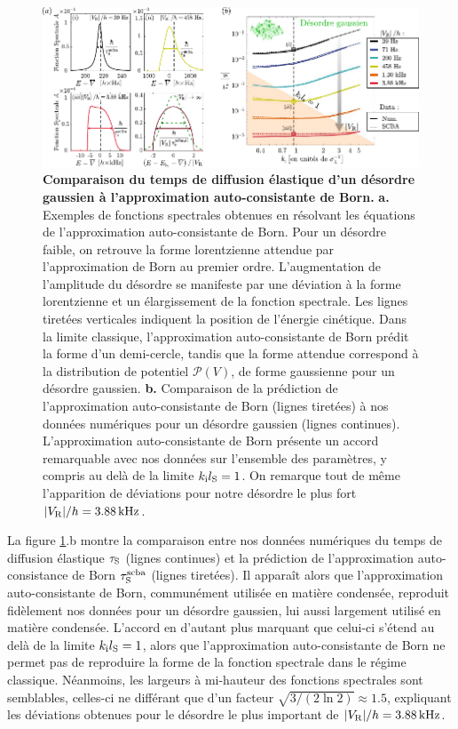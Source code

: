 \begin{figure}
\centering
\includegraphics[width=\textwidth]{Fig/TauS_NJP/SCBA_gauss.pdf}
\caption{\textbf{Comparaison du temps de diffusion élastique d'un désordre gaussien à l'approximation auto-consistante de Born.} \textbf{a.} Exemples de fonctions spectrales obtenues en résolvant les équations de l'approximation auto-consistante de Born. Pour un désordre faible, on retrouve la forme lorentzienne attendue par l'approximation de Born au premier ordre. L'augmentation de l'amplitude du désordre se manifeste par une déviation à la forme lorentzienne et un élargissement de la fonction spectrale. Les lignes tiretées verticales indiquent la position de l'énergie cinétique. Dans la limite classique, l'approximation auto-consistante de Born prédit la forme d'un demi-cercle, tandis que la forme attendue correspond à la distribution de potentiel $\mathcal{P}(V)$, de forme gaussienne pour un désordre gaussien. \textbf{b.} Comparaison de la prédiction de l'approximation auto-consistante de Born (lignes tiretées) à nos données numériques pour un désordre gaussien (lignes continues). L'approximation auto-consistante de Born présente un accord remarquable avec nos données sur l'ensemble des paramètres, y compris au delà de la limite $k_{\mathrm{i}}l_{\mathrm{S}}=1$. On remarque tout de même l'apparition de déviations pour notre désordre le plus fort $|V_{\mathrm{R}}|/h=\SI{3.88}{\kilo\hertz}$.}
\label{fig:SCBA_gauss}
\end{figure}


La figure \ref{fig:SCBA_gauss}.b montre la comparaison entre nos données numériques du temps de diffusion élastique $\tau_{\mathrm{S}}$ (lignes continues) et la prédiction de l'approximation auto-consistance de Born $\tau_{\mathrm{S}}^{\mathrm{scba}}$ (lignes tiretées). Il apparaît alors que l'approximation auto-consistante de Born, communément utilisée en matière condensée, reproduit fidèlement nos données pour un désordre gaussien, lui aussi largement utilisé en matière condensée. L'accord en d'autant plus marquant que celui-ci s'étend au delà de la limite $k_{\mathrm{i}}l_{\mathrm{S}}=1$, alors que l'approximation auto-consistante de Born ne permet pas de reproduire la forme de la fonction spectrale dans le régime classique. Néanmoins, les largeurs à mi-hauteur des fonctions spectrales sont semblables, celles-ci ne différant que d'un facteur $\sqrt{3/(2\ln 2)}\approx 1.5$, expliquant les déviations obtenues pour le désordre le plus important de $|V_{\mathrm{R}}|/h=\SI{3.88}{\kilo\hertz}$.









